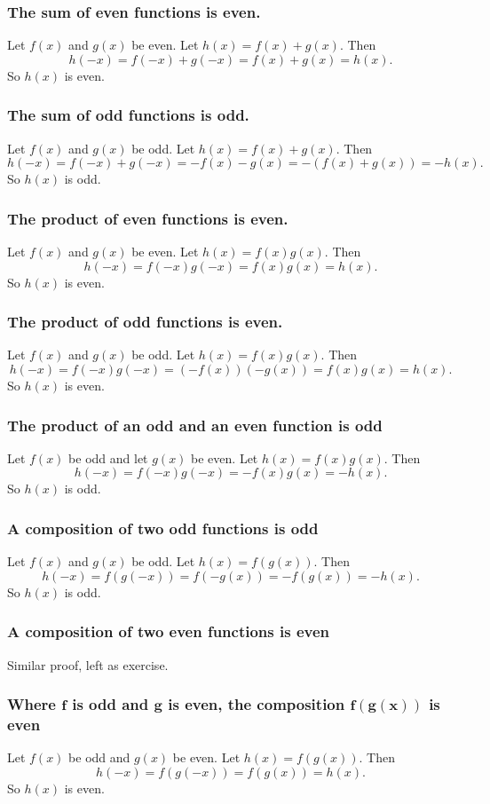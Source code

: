 \subsubsection{The sum of even functions is even.}
Let $f(x)$ and $g(x)$ be even. Let $h(x) = f(x) + g(x)$. Then
\[
h(-x) = f(-x) + g(-x) = f(x) + g(x) = h(x).
\]
So $h(x)$ is even.
\subsubsection{The sum of odd functions is odd.}
Let $f(x)$ and $g(x)$ be odd. Let $h(x) = f(x) + g(x)$. Then
\[
h(-x) = f(-x) + g(-x) = -f(x) - g(x) = -(f(x) + g(x)) = -h(x).
\]
So $h(x)$ is odd.
\subsubsection{The product of even functions is even.}
Let $f(x)$ and $g(x)$ be even. Let $h(x) = f(x)g(x)$. Then
\[
h(-x) = f(-x)g(-x) = f(x)g(x) = h(x).
\]
So $h(x)$ is even.
\subsubsection{The product of odd functions is even.}
Let $f(x)$ and $g(x)$ be odd. Let $h(x) = f(x)g(x)$. Then
\[
h(-x) = f(-x)g(-x) = (-f(x))(-g(x)) = f(x)g(x) = h(x). \tag{as $(-1)\times(-1) = 1$}
\]
So $h(x)$ is even.
\subsubsection{The product of an odd and an even function is odd}
Let $f(x)$ be odd and let $g(x)$ be even. Let $h(x) = f(x)g(x)$. Then
\[
h(-x) = f(-x)g(-x) = -f(x)g(x) = -h(x).
\]
So $h(x)$ is odd.
\subsubsection{A composition of two odd functions is odd}
Let $f(x)$ and $g(x)$ be odd. Let $h(x) = f(g(x))$. Then
\[
h(-x) = f(g(-x)) = f(-g(x)) = -f(g(x)) = -h(x).
\]
So $h(x)$ is odd.
\subsubsection{A composition of two even functions is even}
Similar proof, left as exercise.
\subsubsection{Where $\boldsymbol{f}$ is odd and $\boldsymbol{g}$ is even, the composition $\boldsymbol{f(g(x))}$ is even}
Let $f(x)$ be odd and $g(x)$ be even. Let $h(x) = f(g(x))$. Then
\[
h(-x) = f(g(-x)) = f(g(x)) = h(x).
\]
So $h(x)$ is even.
